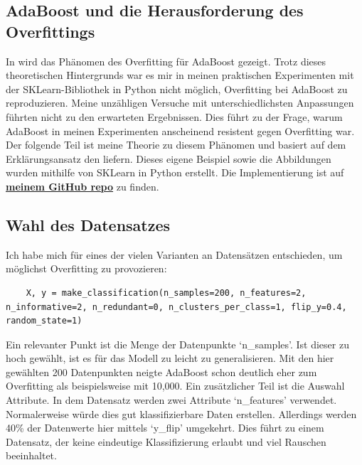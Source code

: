 \subsection{AdaBoost und die Herausforderung des Overfittings}
In \textcite[Kapitel 1.2.3]{SchapireFreund2012} wird das Phänomen des Overfitting für AdaBoost gezeigt. Trotz dieses theoretischen Hintergrunds war es mir in meinen praktischen Experimenten mit der SKLearn-Bibliothek in Python nicht möglich, Overfitting bei AdaBoost zu reproduzieren. Meine unzähligen Versuche mit unterschiedlichsten Anpassungen führten nicht zu den erwarteten Ergebnissen. Dies führt zu der Frage, warum AdaBoost in meinen Experimenten anscheinend resistent gegen Overfitting war. Der folgende Teil ist meine Theorie zu diesem Phänomen und basiert auf dem Erklärungsansatz den \textcite{SchapireFreund2012} liefern. Dieses eigene Beispiel sowie die Abbildungen wurden mithilfe von SKLearn in Python erstellt. Die Implementierung ist auf \textbf{\href{https://github.com/CodeLtDave/Boosting-Algorithms-ML-Seminararbeit/blob/main/python-env/ToleranceOverfittingAdaBoost.ipynb}{meinem GitHub repo}} zu finden.

\subsection{Wahl des Datensatzes}

Ich habe mich für eines der vielen Varianten an Datensätzen entschieden, um möglichst Overfitting zu provozieren:

\begin{lstlisting}
    X, y = make_classification(n_samples=200, n_features=2, n_informative=2, n_redundant=0, n_clusters_per_class=1, flip_y=0.4, random_state=1)
\end{lstlisting}    
Ein relevanter Punkt ist die Menge der Datenpunkte `n\_samples'. Ist dieser zu hoch 
gewählt, ist es für das Modell zu leicht zu generalisieren. Mit den hier gewählten 200 Datenpunkten neigte AdaBoost schon deutlich eher zum Overfitting als beispielsweise mit 10,000.
\newline
Ein zusätzlicher Teil ist die Auswahl Attribute. In dem Datensatz werden zwei Attribute `n\_features' verwendet. Normalerweise würde dies gut klassifizierbare Daten erstellen. Allerdings werden 40\% der Datenwerte hier mittels `y\_flip' umgekehrt. Dies führt zu einem Datensatz, der keine eindeutige Klassifizierung erlaubt und viel Rauschen beeinhaltet.

